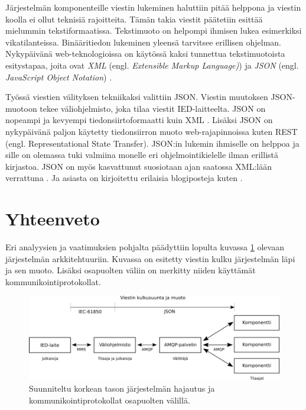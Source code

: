 Järjestelmän komponenteille viestin lukeminen haluttiin pitää helppona ja viestin koolla ei ollut teknisiä rajoitteita. Tämän takia viestit päätetiin esittää mielummin tekstiformaatissa. Tekstimuoto on helpompi ihmisen lukea esimerkiksi vikatilanteissa. Binääritiedon lukeminen yleensä tarvitsee erillisen ohjelman. Nykypäivänä web-teknologioissa on käytössä kaksi tunnettua tekstimuotoista esitystapaa, joita ovat \emph{XML} (engl. \emph{Extensible Markup Language)}) \cite{xml-specification} ja \emph{JSON} (engl. \emph{JavaScript Object Notation}) \cite{json-standard}.

Työssä viestien välityksen tekniikaksi valittiin JSON. Viestin muutoksen JSON-muotoon tekee väliohjelmisto, joka tilaa viestit IED-laitteelta. JSON on nopeampi ja kevyempi tiedonsiirtoformaatti kuin XML \cite{json-xml-comparison}. Lisäksi JSON on nykypäivänä paljon käytetty tiedonsiirron muoto web-rajapinnoissa kuten REST (engl. Representational State Transfer). JSON:in lukemin ihmiselle on helppoa ja sille on olemassa tuki valmiina monelle eri ohjelmointikielelle ilman erillistä kirjastoa. JSON on myös kasvattunut suosiotaan ajan saatossa XML:lään verrattuna \cite{google-trends-xml-json}. Ja asiasta on kirjoitettu erilaisia blogiposteja kuten \cite{the-rise-and-rise-of-json, why-json-is-better-than-xml, Patrizio2016}.


\section{Yhteenveto}
Eri analyysien ja vaatimuksien pohjalta päädyttiin lopulta kuvassa \ref{fig:high-level-system-architecture} olevaan järjestelmän arkkitehtuuriin. Kuvassa on esitetty viestin kulku järjestelmän läpi ja sen muoto. Lisäksi osapuolten väliin on merkitty niiden käyttämät kommunikointiprotokollat.

\begin{figure}[ht!]
	\includegraphics[width=1\textwidth]{pictures/high-level-system-architecture.png}
	\caption{Suunniteltu korkean tason järjestelmän hajautus ja kommunikointiprotokollat osapuolten välillä.}
	\label{fig:high-level-system-architecture}
\end{figure}

